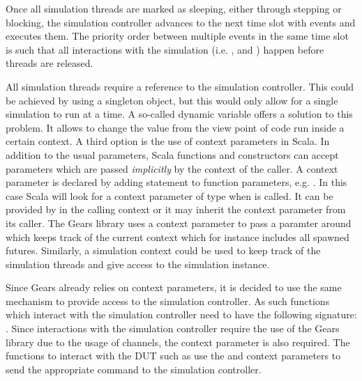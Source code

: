 Once all simulation threads are marked as sleeping, either through stepping or blocking, the simulation controller
advances to the next time slot with events and executes them. The priority order between multiple events in the same
time slot is such that all interactions with the simulation (i.e. ,  and )
happen before threads are released.


All simulation threads require a reference to the simulation controller. This could be achieved by using a singleton
object, but this would only allow for a single simulation to run at a time. A so-called dynamic variable offers a solution to this problem. It allows to change the value from the view point of code run inside a certain context. 
A third option is the use of context parameters in Scala. In addition to the usual parameters, Scala functions and constructors can accept parameters which are passed \textit{implicitly} by the context of the caller. A context parameter is declared by adding  statement to function parameters, e.g. . In this case Scala will look for a context parameter of type  when  is called. It can be provided by  in the calling context or it may inherit the context parameter from its caller. The Gears library uses a context parameter to pass a  paramter around which keeps track of the current context which for instance includes all spawned futures. Similarly, a simulation context could be used to keep track of the simulation threads and give access to the simulation instance.

Since Gears already relies on context parameters, it is decided to use the same mechanism to provide access to the simulation controller. As such functions which interact with the simulation controller need to have the
following signature: . Since interactions with the simulation controller require the use of the Gears library due to the usage of channels, the 
context parameter is also required. The functions to interact with the DUT such as  use the
 and  context parameters to send the appropriate command to the simulation controller.

